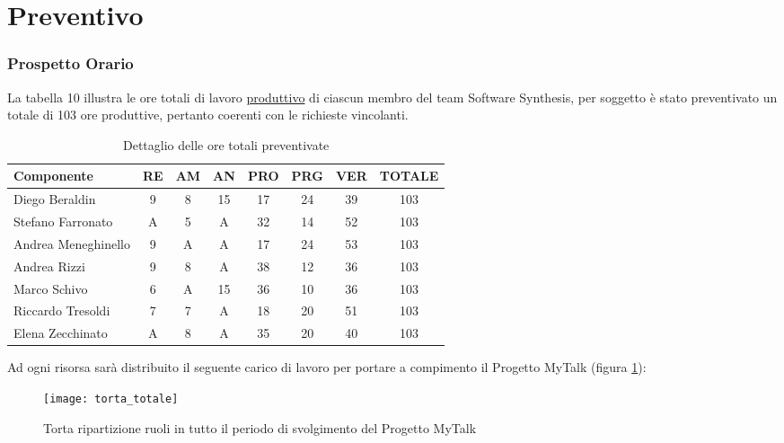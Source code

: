 \clearpage
\section{Preventivo}
\subsubsection{Prospetto Orario}
La tabella 10 illustra le ore totali di lavoro \underline{produttivo} di ciascun membro del team Software Synthesis, per soggetto è stato preventivato un totale di 103 ore produttive, pertanto coerenti con le richieste vincolanti.
\begin{table}[h]
\centering
\begin{tabular}{|l|c|c|c|c|c|c|c|}
\hline
Componente& RE& AM& AN& PRO& PRG& VER& TOTALE\\
\hline
Diego Beraldin & 9& 8& 15& 17& 24& 39& 103\\
Stefano Farronato & A& 5& A& 32& 14& 52&  103\\
Andrea Meneghinello & 9& A& A& 17& 24& 53& 103\\
Andrea Rizzi & 9& 8& A& 38& 12& 36& 103\\
Marco Schivo & 6& A& 15& 36& 10& 36& 103\\
Riccardo Tresoldi & 7& 7& A& 18& 20& 51& 103\\
Elena Zecchinato & A& 8& A& 35& 20& 40& 103\\
\hline
\end{tabular}
\caption{Dettaglio delle ore totali preventivate}\label{tab:oretotali}
\end{table}

Ad ogni risorsa sarà distribuito il seguente carico di lavoro per portare a compimento il Progetto MyTalk (figura \ref{fig:oretotali}):\\
\begin{figure}[h!]
\centering
  \texttt{[image: torta\_totale]}
\caption{Torta ripartizione ruoli in tutto il periodo di svolgimento del Progetto MyTalk}\label{fig:oretotali}
\end{figure}
\clearpage
